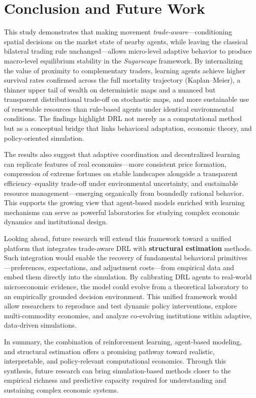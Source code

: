 \documentclass[pdflatex,sn-mathphys-num]{sn-jnl}%
\theoremstyle{thmstyleone}%
\theoremstyle{thmstyletwo}%
\theoremstyle{thmstylethree}%
\begin{document}
\section{Conclusion and Future Work}

This study demonstrates that making movement \emph{trade-aware}---conditioning spatial decisions on the market state of nearby agents, while leaving the classical bilateral trading rule unchanged---allows micro-level adaptive behavior to produce macro-level equilibrium stability in the \textit{Sugarscape} framework.  
By internalizing the value of proximity to complementary traders, learning agents achieve higher survival rates confirmed across the full mortality trajectory (Kaplan--Meier), a thinner upper tail of wealth on deterministic maps and a nuanced but transparent distributional trade-off on stochastic maps, and more sustainable use of renewable resources than rule-based agents under identical environmental conditions.  
The findings highlight DRL not merely as a computational method but as a conceptual bridge that links behavioral adaptation, economic theory, and policy-oriented simulation.

The results also suggest that adaptive coordination and decentralized learning can replicate features of real economies---more consistent price formation, compression of extreme fortunes on stable landscapes alongside a transparent efficiency--equality trade-off under environmental uncertainty, and sustainable resource management---emerging organically from boundedly rational behavior.  
This supports the growing view that agent-based models enriched with learning mechanisms can serve as powerful laboratories for studying complex economic dynamics and institutional design.

Looking ahead, future research will extend this framework toward a unified platform that integrates trade-aware DRL with \textbf{structural estimation} methods.  
Such integration would enable the recovery of fundamental behavioral primitives---preferences, expectations, and adjustment costs---from empirical data and embed them directly into the simulation.  
By calibrating DRL agents to real-world microeconomic evidence, the model could evolve from a theoretical laboratory to an empirically grounded decision environment.  
This unified framework would allow researchers to reproduce and test dynamic policy interventions, explore multi-commodity economies, and analyze co-evolving institutions within adaptive, data-driven simulations.

In summary, the combination of reinforcement learning, agent-based modeling, and structural estimation offers a promising pathway toward realistic, interpretable, and policy-relevant computational economics.  
Through this synthesis, future research can bring simulation-based methods closer to the empirical richness and predictive capacity required for understanding and sustaining complex economic systems.
\end{document}
